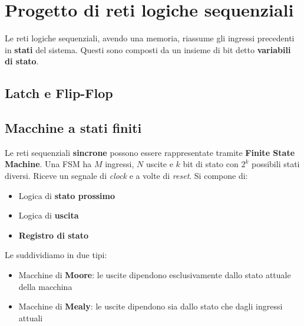 \newpage
\section{Progetto di reti logiche sequenziali}
Le reti logiche sequenziali, avendo una memoria, riassume gli ingressi precedenti in \textbf{stati} del sistema. Questi sono composti da un insieme di bit detto \textbf{variabili di stato}.
\subsection{Latch e Flip-Flop}

\subsection{Macchine a stati finiti}
Le reti sequenziali \textbf{sincrone} possono essere rappresentate tramite \textbf{Finite State Machine}. Una FSM ha $M$ ingressi, $N$ uscite e $k$ bit di stato con $2^k$ possibili stati diversi. Riceve un segnale di \textit{clock} e a volte di \textit{reset}. Si compone di:
\begin{itemize}
	\item Logica di \textbf{stato prossimo}
	\item Logica di \textbf{uscita}
	\item \textbf{Registro di stato}
\end{itemize}
Le suddividiamo in due tipi:
\begin{itemize}
	\item Macchine di \textbf{Moore}: le uscite dipendono esclusivamente dallo stato attuale della macchina
	\item Macchine di \textbf{Mealy}: le uscite dipendono sia dallo stato che dagli ingressi attuali
\end{itemize}
